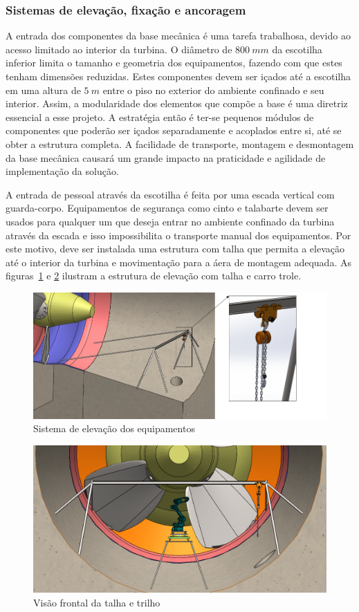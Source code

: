 \subsubsection{Sistemas de elevação, fixação e ancoragem}
A entrada dos componentes da base mecânica é uma tarefa trabalhosa, devido ao
acesso limitado ao interior da turbina. O diâmetro de $800~mm$ da escotilha
inferior limita o tamanho e geometria dos equipamentos, fazendo com que estes
tenham dimensões reduzidas.
Estes componentes devem ser içados até a escotilha em uma altura de $5~m$ entre
o piso no exterior do ambiente confinado e seu interior. Assim, a modularidade dos elementos que compõe a base
é uma diretriz essencial a esse projeto. A estratégia então é ter-se pequenos módulos de componentes
que poderão ser içados separadamente e acoplados entre si, até se obter a
estrutura completa. 
A facilidade de transporte, montagem e desmontagem da base mecânica causará um
grande impacto na praticidade e agilidade de implementação da solução.

A entrada de pessoal através da escotilha é feita por uma escada vertical com
guarda-corpo. Equipamentos de segurança como
cinto e talabarte devem ser usados para qualquer um que deseja entrar no
ambiente confinado da turbina através da escada e isso impossibilita o
transporte manual dos equipamentos. Por este motivo, deve ser instalada uma
estrutura com talha que permita a elevação até o interior da turbina e
movimentação para a áera de montagem adequada. As figuras~\ref{fig::talha} e
\ref{fig::talha_trilho} ilustram a estrutura de elevação com talha e carro
trole. 
  
\begin{figure}[h!]
   \centering
   \includegraphics[width=0.8\columnwidth]{detail/figs/bases/talha}
   \caption{Sistema de elevação dos equipamentos}
   \label{fig::talha}
\end{figure}

\begin{figure}[h!]
   \centering
   \includegraphics[width=0.8\columnwidth]{detail/figs/bases/talha_trilho}
   \caption{Visão frontal da talha e trilho}
   \label{fig::talha_trilho}
\end{figure}

